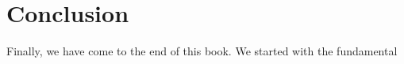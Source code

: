 
\chapter{Conclusion}

Finally, we have come to the end of this book. We started with the fundamental 